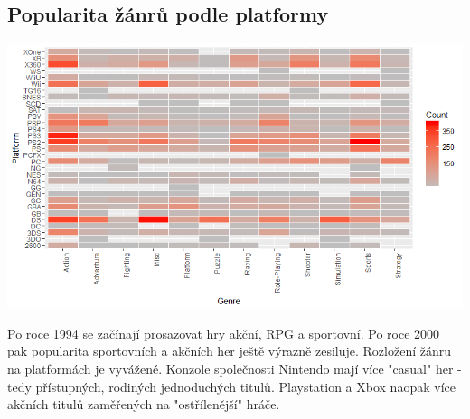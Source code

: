 \documentclass[a4paper,11pt]{article}
\begin{document}
\subsection{Popularita žánrů podle platformy}
\includegraphics[scale=0.65]{Rplot09}

Po roce 1994 se začínají prosazovat hry akční, RPG a sportovní. Po roce 2000 pak popularita sportovních a akčních her ještě výrazně zesiluje. Rozložení žánru na platformách je vyvážené. Konzole společnosti Nintendo mají více "casual" her - tedy přístupných, rodiných jednoduchých titulů. Playstation a Xbox naopak více akčních titulů zaměřených na "ostřílenější" hráče.
\end{document}
